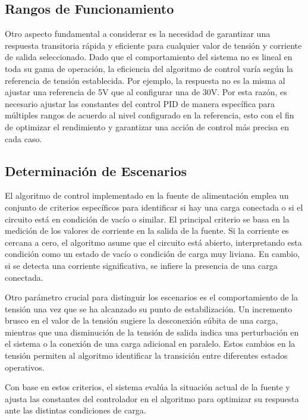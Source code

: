 \subsection{Rangos de Funcionamiento}
Otro aspecto fundamental a considerar es la necesidad de garantizar una respuesta transitoria rápida y eficiente para cualquier valor de tensión y corriente de salida seleccionado. Dado que el comportamiento del sistema no es lineal en toda su gama de operación, la eficiencia del algoritmo de control varía según la referencia de tensión establecida. Por ejemplo, la respuesta no es la misma al ajustar una referencia de 5V que al configurar una de 30V. Por esta razón, es necesario ajustar las constantes del control PID de manera específica para múltiples rangos de acuerdo al nivel configurado en la referencia, esto con el fin de optimizar el rendimiento y garantizar una acción de control más precisa en cada caso.\par

\subsection{Determinación de Escenarios}
El algoritmo de control implementado en la fuente de alimentación emplea un conjunto de criterios específicos para identificar si hay una carga conectada o si el circuito está en condición de vacío o similar. El principal criterio se basa en la medición de los valores de corriente en la salida de la fuente. Si la corriente es cercana a cero, el algoritmo asume que el circuito está abierto, interpretando esta condición como un estado de vacío o condición de carga muy liviana. En cambio, si se detecta una corriente significativa, se infiere la presencia de una carga conectada. \par
Otro parámetro crucial para distinguir los escenarios es el comportamiento de la tensión una vez que se ha alcanzado su punto de estabilización. Un incremento brusco en el valor de la tensión sugiere la desconexión súbita de una carga, mientras que una disminución de la tensión de salida indica una perturbación en el sistema o la conexión de una carga adicional en paralelo. Estos cambios en la tensión permiten al algoritmo identificar la transición entre diferentes estados operativos.\par
Con base en estos criterios, el sistema evalúa la situación actual de la fuente y ajusta las constantes del controlador en el algoritmo para optimizar su respuesta ante las distintas condiciones de carga.\par

